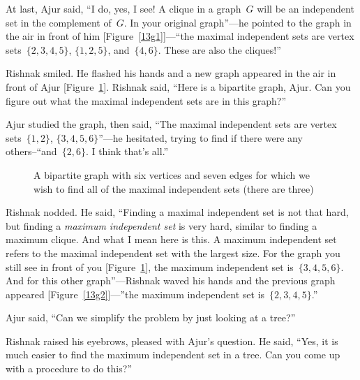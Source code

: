 At last, Ajur said, ``I do, yes, I see! A clique in a graph~$G$ will be an independent set in the 
complement of~$G$. In your original graph''---he pointed to the graph in the air in front of him [Figure~\ref{13g1}]---``the maximal independent sets are vertex sets~$\{2,3,4,5\}$, $\{1,2,5\}$, and~$\{4,6\}$. These are also the cliques!''

Rishnak smiled. He flashed his hands and a new graph appeared in the air in front of Ajur [Figure~\ref{13g3}]. Rishnak said, ``Here is a bipartite graph, Ajur. Can you figure out what the maximal independent sets are in this graph?'' 

Ajur studied the graph, then said, ``The maximal independent sets are vertex sets~$\{1,2\}$, $\{3,4,5,6\}$''---he hesitated, trying to find if there were any others--``and~$\{2,6\}$. I think that's all.''

\begin{figure}
\begin{center}
\caption{A bipartite graph with six vertices and seven edges for which we wish to find all of the maximal independent sets (there are three)}\label{13g3}
\end{center}
\end{figure}

Rishnak nodded. He said, ``Finding a maximal independent set is not that hard, but finding a \textit{maximum independent set} is very hard, similar to finding a maximum clique. And what I mean here is this. A maximum independent set refers to the maximal independent set with the largest size. For the graph you still see in front of you [Figure~\ref{13g3}], the maximum independent set is~$\{3,4,5,6\}$. And for this other graph''---Rishnak waved his hands and the previous graph appeared [Figure~\ref{13g2}]---''the maximum independent set is~$\{2,3,4,5\}$.''  

Ajur said, ``Can we simplify the problem by just looking at a tree?''

Rishnak raised his eyebrows, pleased with Ajur's question.  He said, ``Yes, it is much easier to find the maximum independent set in a tree.  Can you come up with a procedure to do this?''

